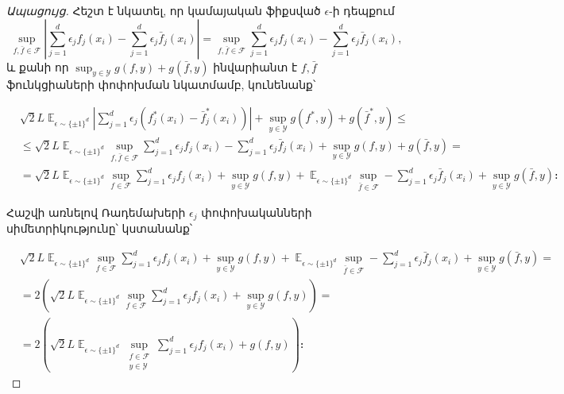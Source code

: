 \documentclass[12pt]{article}
\DeclareMathOperator*{\E}{\mathbb{E}}
\begin{document}
\begin{proof}[Ապացույց]
Հեշտ է նկատել, որ կամայական ֆիքսված $\epsilon$-ի դեպքում 
$$\sup_{f, \bar{f} \in \mathcal{F}}      \left |  \sum_{j=1}^d \epsilon_j f_j(x_i) - \sum_{j=1}^d \epsilon_j\bar{f}_j(x_i)  \right|  = 
\sup_{f, \bar{f} \in \mathcal{F}}         \sum_{j=1}^d \epsilon_j f_j(x_i) - \sum_{j=1}^d \epsilon_j\bar{f}_j(x_i)   ,$$
և քանի որ $\sup_{y \in \mathcal{Y}}    g(f, y) + g(\bar{f}, y)$ ինվարիանտ է $f, \bar{f}$ ֆունկցիաների փոփոխման նկատմամբ, կունենանք՝ 

\begin{align*}
&  {\sqrt{2}L} \E_{\epsilon \sim \{\pm 1\}^d}    \left |  \sum_{j=1}^d \epsilon_j (f^*_j(x_i) - \bar{f}_j^*(x_i))  \right|                    + \sup_{y \in \mathcal{Y}}    g(f^*, y) + g(\bar{f}^*, y)  \leq \\
&\leq  {\sqrt{2}L} \E_{\epsilon \sim \{\pm 1\}^d}        \sup_{f, \bar{f} \in \mathcal{F}}        \sum_{j=1}^d \epsilon_j f_j(x_i) - \sum_{j=1}^d \epsilon_j\bar{f}_j(x_i)                      + \sup_{y \in \mathcal{Y}}    g(f, y) + g(\bar{f}, y)  = \\
&=  {\sqrt{2}L} \E_{\epsilon \sim \{\pm 1\}^d}        \sup_{f \in \mathcal{F}}        \sum_{j=1}^d \epsilon_j f_j(x_i)    + \sup_{y \in \mathcal{Y}}    g(f, y)    +  \E_{\epsilon \sim \{\pm 1\}^d}        \sup_{\bar{f} \in \mathcal{F}}   -  \sum_{j=1}^d \epsilon_j\bar{f}_j(x_i)                      + \sup_{y \in \mathcal{Y}}  g(\bar{f}, y) ։
\end{align*}


Հաշվի առնելով Ռադեմախերի $\epsilon_j$ փոփոխականների սիմետրիկությունը՝ կստանանք՝

\begin{align*}
&{\sqrt{2}L} \E_{\epsilon \sim \{\pm 1\}^d}        \sup_{f \in \mathcal{F}}        \sum_{j=1}^d \epsilon_j f_j(x_i)    + \sup_{y \in \mathcal{Y}}    g(f, y)    +  \E_{\epsilon \sim \{\pm 1\}^d}        \sup_{\bar{f} \in \mathcal{F}}   -  \sum_{j=1}^d \epsilon_j\bar{f}_j(x_i)                      + \sup_{y \in \mathcal{Y}}  g(\bar{f}, y)  = \\
&= 2\left({\sqrt{2}L} \E_{\epsilon \sim \{\pm 1\}^d}        \sup_{f \in \mathcal{F}}        \sum_{j=1}^d \epsilon_j f_j(x_i)    + \sup_{y \in \mathcal{Y}}    g(f, y)  \right)    = \\
&=  2\left({\sqrt{2}L} \E_{\epsilon \sim \{\pm 1\}^d}        \sup_{\substack{f \in \mathcal{F}  \\ y \in \mathcal{Y}  }}     \sum_{j=1}^d \epsilon_j f_j(x_i)    +   g(f, y)  \right)։    
\end{align*}


\end{proof}
\end{document}
